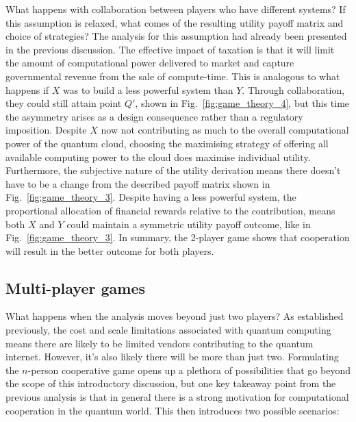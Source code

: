 What happens with collaboration between players who have different systems? If this assumption is relaxed, what comes of the resulting utility payoff matrix and choice of strategies? The analysis for this assumption had already been presented in the previous discussion. The effective impact of taxation is that it will limit the amount of computational power delivered to market and capture governmental revenue from the sale of compute-time. This is analogous to what happens if $X$ was to build a less powerful system than $Y$. Through collaboration, they could still attain point $Q'$, shown in Fig.~\ref{fig:game_theory_4}, but this time the asymmetry arises as a design consequence rather than a regulatory imposition. Despite $X$ now not contributing as much to the overall computational power of the quantum cloud, choosing the maximising strategy of offering all available computing power to the cloud does maximise individual utility. Furthermore, the subjective nature of the utility derivation means there doesn't have to be a change from the described payoff matrix shown in Fig.~\ref{fig:game_theory_3}. Despite having a less powerful system, the proportional allocation of financial rewards relative to the contribution, means both $X$ and $Y$ could maintain a symmetric utility payoff outcome, like in Fig.~\ref{fig:game_theory_3}. In summary, the 2-player game shows that cooperation will result in the better outcome for both players.


\subsection{Multi-player games}

What happens when the analysis moves beyond just two players? As established previously, the cost and scale limitations associated with quantum computing means there are likely to be limited vendors contributing to the quantum internet. However, it's also likely there will be more than just two. Formulating the $n$-person cooperative game opens up a plethora of possibilities that go beyond the scope of this introductory discussion, but one key takeaway point from the previous analysis is that in general there is a strong motivation for computational cooperation in the quantum world. This then introduces two possible scenarios:

